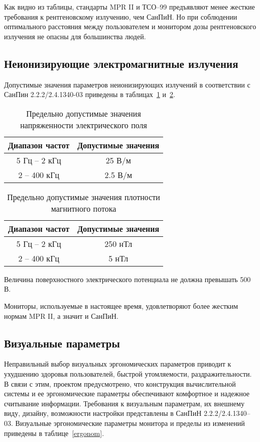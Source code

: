 Как видно из таблицы, стандарты MPR II и ТСО--99 предъявляют менее жесткие требования к рентгеновскому излучению, чем СанПиН. Но при соблюдении оптимального расстояния между пользователем и монитором дозы рентгеновского излучения не опасны для большинства людей.

\subsection{Неионизирующие электромагнитные излучения}

Допустимые значения параметров неионизирующих излучений в соответствии с СанПин 2.2.2/2.4.1340-03 приведены в таблицах~\ref{tab:U} и~\ref{tab:ro}.

\begin{table}[ht]
\caption{Предельно допустимые значения напряженности электрического поля}
\begin{tabular}{|c|c|}
\hline
Диапазон частот& Допустимые значения \\
\hline
5 Гц -- 2 кГц & 25 В/м \\
\hline
2 -- 400 кГц& 2.5 В/м \\
\hline
\end{tabular}
\label{tab:U}
\end{table}

\begin{table}[ht]
\caption{Предельно допустимые значения плотности магнитного потока}
\begin{tabular}{|c|c|}
\hline
Диапазон частот& Допустимые значения \\
\hline
5 Гц -- 2 кГц & 250 нТл \\
\hline
2 -- 400 кГц& 5 нТл \\
\hline
\end{tabular}
\label{tab:ro}
\end{table}

Величина поверхностного электрического потенциала не должна превышать 500 В.

Мониторы, используемые в настоящее время, удовлетворяют более жестким нормам MPR II, а значит и СанПиН.

\subsection{Визуальные параметры}

Неправильный выбор визуальных эргономических параметров приводит к ухудшению здоровья пользователей, быстрой утомляемости, раздражительности. В связи с этим, проектом предусмотрено, что конструкция вычислительной системы и ее эргономические параметры обеспечивают комфортное и надежное считывание информации. Требования к визуальным параметрам, их внешнему виду, дизайну, возможности настройки представлены в СанПиН 2.2.2/2.4.1340--03. Визуальные эргономические параметры монитора и пределы из изменений приведены в таблице~\ref{ergonom}.

